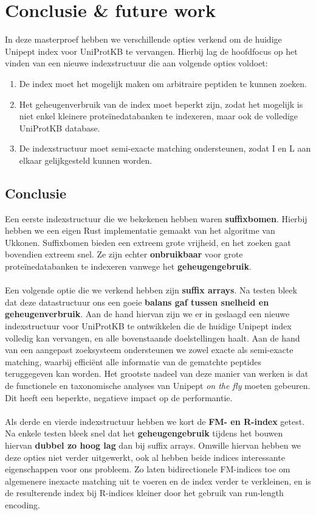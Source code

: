 \chapter{Conclusie \& future work}\label{ch:conclusie}
In deze masterproef hebben we verschillende opties verkend om de huidige Unipept index voor UniProtKB te vervangen.
Hierbij lag de hoofdfocus op het vinden van een nieuwe indexstructuur die aan volgende opties voldoet:
\begin{enumerate}
    \item De index moet het mogelijk maken om arbitraire peptiden te kunnen zoeken.
    \item Het geheugenverbruik van de index moet beperkt zijn, zodat het mogelijk is niet enkel kleinere proteïnedatabanken te indexeren, maar ook de volledige UniProtKB database\@.
    \item De indexstructuur moet semi-exacte matching ondersteunen, zodat I en L aan elkaar gelijkgesteld kunnen worden.
\end{enumerate}

\section{Conclusie}
Een eerste indexstructuur die we bekekenen hebben waren \textbf{suffixbomen}.
Hierbij hebben we een eigen Rust implementatie gemaakt van het algoritme van Ukkonen.
Suffixbomen bieden een extreem grote vrijheid, en het zoeken gaat bovendien extreem snel.
Ze zijn echter \textbf{onbruikbaar} voor grote proteïnedatabanken te indexeren vanwege het \textbf{geheugengebruik}.
\\ \\
Een volgende optie die we verkend hebben zijn \textbf{suffix arrays}.
Na testen bleek dat deze datastructuur ons een goeie \textbf{balans gaf tussen snelheid en geheugenverbruik}.
Aan de hand hiervan zijn we er in geslaagd een nieuwe indexstructuur voor UniProtKB te ontwikkelen die de huidige Unipept index volledig kan vervangen, en alle bovenstaande doelstellingen haalt.
Aan de hand van een aangepast zoeksysteem ondersteunen we zowel exacte als semi-exacte matching, waarbij efficiënt alle informatie van de gematchte peptides teruggegeven kan worden.
Het grootste nadeel van deze manier van werken is dat de functionele en taxonomische analyses van Unipept \textit{on the fly} moeten gebeuren.
Dit heeft een beperkte, negatieve impact op de performantie.
\\ \\
Als derde en vierde indexstructuur hebben we kort de \textbf{FM- en R-index} getest.
Na enkele testen bleek snel dat het \textbf{geheugengebruik} tijdens het bouwen hiervan \textbf{dubbel zo hoog lag} dan bij suffix arrays.
Omwille hiervan hebben we deze opties niet verder uitgewerkt, ook al hebben beide indices interessante eigenschappen voor ons probleem.
Zo laten bidirectionele FM-indices toe om algemenere inexacte matching uit te voeren en de index verder te verkleinen, en is de resulterende index bij R-indices kleiner door het gebruik van run-length encoding.

